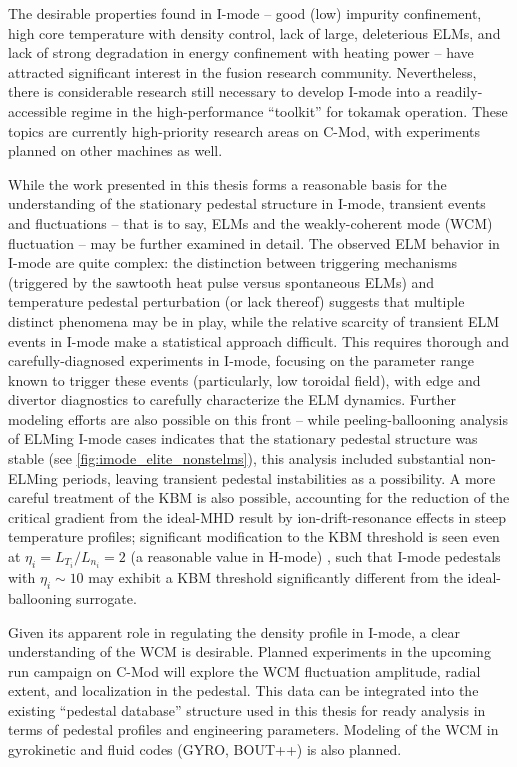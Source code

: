 The desirable properties found in I-mode -- good (low) impurity confinement, high core temperature with density control, lack of large, deleterious ELMs, and lack of strong degradation in energy confinement with heating power -- have attracted significant interest in the fusion research community.  Nevertheless, there is considerable research still necessary to develop I-mode into a readily-accessible regime in the high-performance ``toolkit'' for tokamak operation.  These topics are currently high-priority research areas on C-Mod, with experiments planned on other machines as well.

While the work presented in this thesis forms a reasonable basis for the understanding of the stationary pedestal structure in I-mode, transient events and fluctuations -- that is to say, ELMs and the weakly-coherent mode (WCM) fluctuation -- may be further examined in detail.  The observed ELM behavior in I-mode are quite complex: the distinction between triggering mechanisms (\ie triggered by the sawtooth heat pulse versus spontaneous ELMs) and temperature pedestal perturbation (or lack thereof) suggests that multiple distinct phenomena may be in play, while the relative scarcity of transient ELM events in I-mode make a statistical approach difficult.  This requires thorough and carefully-diagnosed experiments in I-mode, focusing on the parameter range known to trigger these events (particularly, low toroidal field), with edge and divertor diagnostics to carefully characterize the ELM dynamics.  Further modeling efforts are also possible on this front -- while peeling-ballooning analysis of ELMing I-mode cases indicates that the stationary pedestal structure was stable (see \cref{fig:imode_elite_nonstelms}), this analysis included substantial non-ELMing periods, leaving transient pedestal instabilities as a possibility.  A more careful treatment of the KBM is also possible, accounting for the reduction of the critical gradient from the ideal-MHD result by ion-drift-resonance effects in steep temperature profiles; significant modification to the KBM threshold is seen even at $\eta_i = L_{T_i}/L_{n_i} = 2$ (a reasonable value in H-mode) \cite{Snyder2001}, such that I-mode pedestals with $\eta_i \sim 10$ \cite{Whyte2010} may exhibit a KBM threshold significantly different from the ideal-ballooning surrogate.

Given its apparent role in regulating the density profile in I-mode, a clear understanding of the WCM is desirable.  Planned experiments in the upcoming run campaign on C-Mod will explore the WCM fluctuation amplitude, radial extent, and localization in the pedestal.  This data can be integrated into the existing ``pedestal database'' structure used in this thesis for ready analysis in terms of pedestal profiles and engineering parameters.  Modeling of the WCM in gyrokinetic and fluid codes (\eg GYRO, BOUT++) is also planned.

